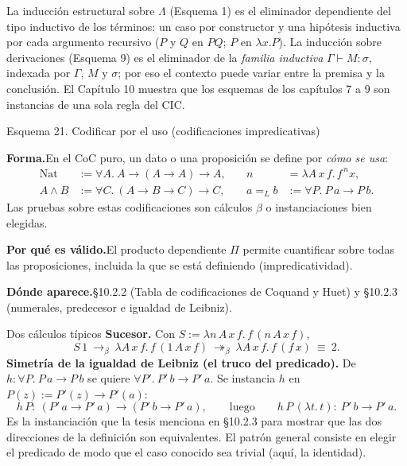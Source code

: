 \documentclass[11pt,a4paper]{article}
\newcommand{\forma}{\par\noindent\textbf{Forma.}\enspace}
\newcommand{\porque}{\par\smallskip\noindent\textbf{Por qué es válido.}\enspace}
\newcommand{\donde}{\par\smallskip\noindent\textbf{Dónde aparece.}\enspace}
\newcommand{\bred}{\rightarrow_\beta}
\newcommand{\bmred}{\twoheadrightarrow_\beta}
\begin{document}
\begin{nota}
La inducción estructural sobre \(\Lambda\) (Esquema 1) es el eliminador
dependiente del tipo inductivo de los términos: un caso por constructor y una
hipótesis inductiva por cada argumento recursivo (\(P\) y \(Q\) en \(PQ\);
\(P\) en \(\lambda x.P\)). La inducción sobre derivaciones (Esquema 9) es el
eliminador de la \emph{familia inductiva} \(\Gamma\vdash M:\sigma\), indexada
por \(\Gamma\), \(M\) y \(\sigma\); por eso el contexto puede variar entre la
premisa y la conclusión. El Capítulo 10 muestra que los esquemas de los
capítulos 7 a 9 son instancias de una sola regla del CIC.
\end{nota}

\begin{esquema}{Esquema 21. Codificar por el uso (codificaciones impredicativas)}
\forma En el CoC puro, un dato o una proposición se define por \emph{cómo se
usa}:
\[
\begin{aligned}
\mathrm{Nat}&:=\forall A.\ A\to(A\to A)\to A,&\quad n&=\lambda A\,x\,f.\,f^{\,n}x,\\
A\wedge B&:=\forall C.\ (A\to B\to C)\to C,&\quad a=_L b&:=\forall P.\ P\,a\to P\,b.
\end{aligned}
\]
Las pruebas sobre estas codificaciones son cálculos \(\beta\) o
instanciaciones bien elegidas.

\porque El producto dependiente \(\Pi\) permite cuantificar sobre todas las
proposiciones, incluida la que se está definiendo (impredicatividad).

\donde §10.2.2 (Tabla de codificaciones de Coquand y Huet) y §10.2.3
(numerales, predecesor e igualdad de Leibniz).
\end{esquema}

\begin{ejemplotesis}{Dos cálculos típicos}
\textbf{Sucesor.} Con \(S:=\lambda n\,A\,x\,f.\,f\,(n\,A\,x\,f)\),
\[
S\,1\ \bred\ \lambda A\,x\,f.\,f\,(1\,A\,x\,f)
\ \bmred\ \lambda A\,x\,f.\,f\,(f\,x)\ \equiv\ 2.
\]
\textbf{Simetría de la igualdad de Leibniz (el truco del predicado).} De
\(h:\forall P.\ P\,a\to P\,b\) se quiere \(\forall P'.\ P'\,b\to P'\,a\). Se
instancia \(h\) en \(P(z):=P'(z)\to P'(a)\):
\[
h\,P:\ (P'\,a\to P'\,a)\to(P'\,b\to P'\,a),
\qquad\text{luego}\qquad
h\,P\,(\lambda t.\,t):\ P'\,b\to P'\,a.
\]
Es la instanciación que la tesis menciona en §10.2.3 para mostrar que las dos
direcciones de la definición son equivalentes. El patrón general consiste en
elegir el predicado de modo que el caso conocido sea trivial (aquí, la
identidad).
\end{ejemplotesis}
\end{document}
